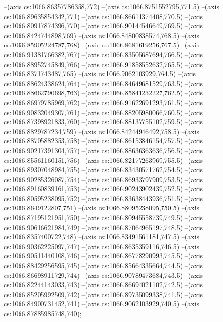 --(axis cs:1066.86357786358,772)
--(axis cs:1066.8751552795,771.5)
--(axis cs:1066.89635854342,771)
--(axis cs:1066.86611374408,770.5)
--(axis cs:1066.80917874396,770)
--(axis cs:1066.90144546649,769.5)
--(axis cs:1066.8424744898,769)
--(axis cs:1066.84800838574,768.5)
--(axis cs:1066.85905224787,768)
--(axis cs:1066.8681619256,767.5)
--(axis cs:1066.91381766382,767)
--(axis cs:1066.83505687694,766.5)
--(axis cs:1066.88952745849,766)
--(axis cs:1066.91858552632,765.5)
--(axis cs:1066.8371743487,765)
--(axis cs:1066.9062103929,764.5)
--(axis cs:1066.88624338624,764)
--(axis cs:1066.84649681529,763.5)
--(axis cs:1066.88662790698,763)
--(axis cs:1066.85841232227,762.5)
--(axis cs:1066.86979785969,762)
--(axis cs:1066.91622691293,761.5)
--(axis cs:1066.90832049307,761)
--(axis cs:1066.88205980066,760.5)
--(axis cs:1066.87398921833,760)
--(axis cs:1066.88137755102,759.5)
--(axis cs:1066.8829787234,759)
--(axis cs:1066.84244946492,758.5)
--(axis cs:1066.88705882353,758)
--(axis cs:1066.86153846154,757.5)
--(axis cs:1066.90217391304,757)
--(axis cs:1066.88636363636,756.5)
--(axis cs:1066.85561160151,756)
--(axis cs:1066.82177263969,755.5)
--(axis cs:1066.89307048984,755)
--(axis cs:1066.83430571762,754.5)
--(axis cs:1066.90285326087,754)
--(axis cs:1066.86933797909,753.5)
--(axis cs:1066.89160839161,753)
--(axis cs:1066.90243902439,752.5)
--(axis cs:1066.80595238095,752)
--(axis cs:1066.83638443936,751.5)
--(axis cs:1066.8649122807,751)
--(axis cs:1066.88095238095,750.5)
--(axis cs:1066.87195121951,750)
--(axis cs:1066.80945558739,749.5)
--(axis cs:1066.90616621984,749)
--(axis cs:1066.87064965197,748.5)
--(axis cs:1066.8357400722,748)
--(axis cs:1066.83491561181,747.5)
--(axis cs:1066.90362225097,747)
--(axis cs:1066.8635359116,746.5)
--(axis cs:1066.90511440108,746)
--(axis cs:1066.86778290993,745.5)
--(axis cs:1066.88429256595,745)
--(axis cs:1066.85664335664,744.5)
--(axis cs:1066.86698911729,744)
--(axis cs:1066.90789473684,743.5)
--(axis cs:1066.82244143033,743)
--(axis cs:1066.86694021102,742.5)
--(axis cs:1066.85205992509,742)
--(axis cs:1066.89735099338,741.5)
--(axis cs:1066.84900731452,741)
--(axis cs:1066.9062103929,740.5)
--(axis cs:1066.87885985748,740);

